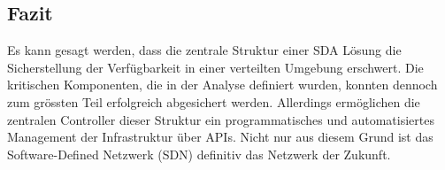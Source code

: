 \subsection{Fazit}
Es kann gesagt werden, dass die zentrale Struktur einer SDA Lösung die Sicherstellung der Verfügbarkeit in einer verteilten Umgebung erschwert. Die kritischen Komponenten, die in der Analyse definiert wurden, konnten dennoch zum grössten Teil erfolgreich abgesichert werden. Allerdings ermöglichen die zentralen Controller dieser Struktur ein programmatisches und automatisiertes Management der Infrastruktur über APIs. Nicht nur aus diesem Grund ist das Software-Defined Netzwerk (SDN) definitiv das Netzwerk der Zukunft. 

